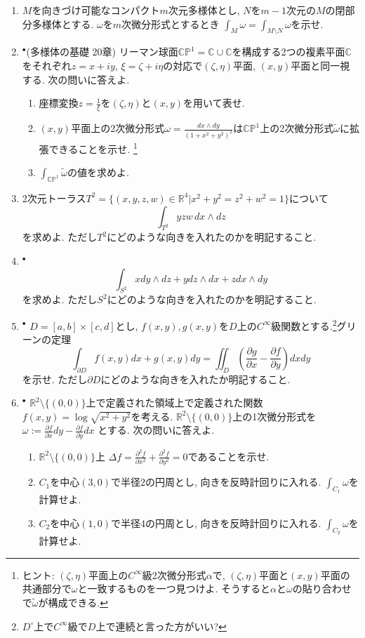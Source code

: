 \documentclass[dvipdfmx,a4paper,11pt]{article}
\newcommand{\R}{\mathbb{R}}
\newcommand{\C}{\mathbb{C}}
\theoremstyle{definition}
\newcommand{\pdrv}[2]{\frac{\partial #1}{\partial #2}}
\begin{document}
\begin{enumerate}[label=\textbf{問}3.\arabic*]
\item $M$を向きづけ可能なコンパクト$m$次元多様体とし, $N $を$m-1$次元の$M$の閉部分多様体とする. $\omega$を$m$次微分形式とするとき
$
\int_{M} \omega = \int_{M \setminus N} \omega
\text{を示せ.}
$
\item $^{\bullet}$(多様体の基礎 20章) リーマン球面$\C\mathbb{P}^1 = \C \cup \C$を構成する2つの複素平面$\C$をそれぞれ$z = x + iy$, $\xi = \zeta + i\eta$の対応で$(\zeta, \eta)$平面, $(x,y)$平面と同一視する. 次の問いに答えよ.
\begin{enumerate}
 \setlength{\parskip}{0cm}
  \setlength{\itemsep}{2pt} 
\item 座標変換$z= \frac{1}{\xi}$を$(\zeta, \eta)$と$(x,y)$を用いて表せ.
\item $(x,y)$平面上の2次微分形式$\omega = \frac{dx \wedge dy}{(1+x^2+y^2)^2}$は$\C\mathbb{P}^1$上の2次微分形式$\widetilde{\omega}$に拡張できることを示せ.
\footnote{ヒント: $(\zeta, \eta)$平面上の$C^{\infty}$級2次微分形式$\alpha$で, $(\zeta, \eta)$平面と$(x,y)$平面の共通部分で$\omega$と一致するものを一つ見つけよ. そうすると$\alpha$と$\omega$の貼り合わせで$\widetilde{\omega}$が構成できる.}
\item $\int_{\C\mathbb{P}^1 } \widetilde{\omega}$の値を求めよ.
\end{enumerate}

\item 2次元トーラス$T^2 = \{(x,y,z,w) \in \R^4 | x^2 + y^2 = z^2 + w^2 =1\}$について
$$
\int_{T^2} yzw \, dx \wedge dz
$$
を求めよ. ただし$T^2$にどのような向きを入れたのかを明記すること.

\item $^{\bullet}$ $$\int_{S^2} x dy \wedge dz + y dz \wedge dx + z dx \wedge dy$$を求めよ. ただし$S^2$にどのような向きを入れたのかを明記すること.
\item  $^{\bullet}$ $D=[a,b] \times [c, d]$とし, $f(x,y), g(x,y)$を$D$上の$C^{\infty}$級関数とする.\footnote{$D^{\circ}$上で$C^{\infty}$級で$D$上で連続と言った方がいい?}グリーンの定理
$$
\int_{\partial D} f(x,y) dx + g(x,y) dy = \iint_{D} \left(\pdrv{g}{x}  -\pdrv{f}{y} \right) dxdy
$$
を示せ. ただし$\partial D$にどのような向きを入れたか明記すること.

\item $^{\bullet}$ $\R^{2} \setminus \{ (0,0)\}$上で定義された領域上で定義された関数$f(x,y) = \log\sqrt{x^2 +y^2}$を考える. $\R^{2}  \setminus  \{ (0,0)\}$上の1次微分形式を
$
\omega := \pdrv{f}{x}dy -  \pdrv{f}{y}dx
$
とする. 次の問いに答えよ.
\begin{enumerate}
 \setlength{\parskip}{0cm}
  \setlength{\itemsep}{2pt} 
\item $\R^{2} \setminus \{ (0,0)\}$上 $\Delta f = \pdrv{^2f}{x^2} + \pdrv{^2f}{y^2} =0$であることを示せ.
\item $C_1$を中心$(3,0)$で半径2の円周とし, 向きを反時計回りに入れる. $\int_{C_1} \omega$を計算せよ.
\item $C_2$を中心$(1,0)$で半径4の円周とし, 向きを反時計回りに入れる. $\int_{C_2} \omega$を計算せよ.
\end{enumerate}



\end{enumerate}
\end{document}
